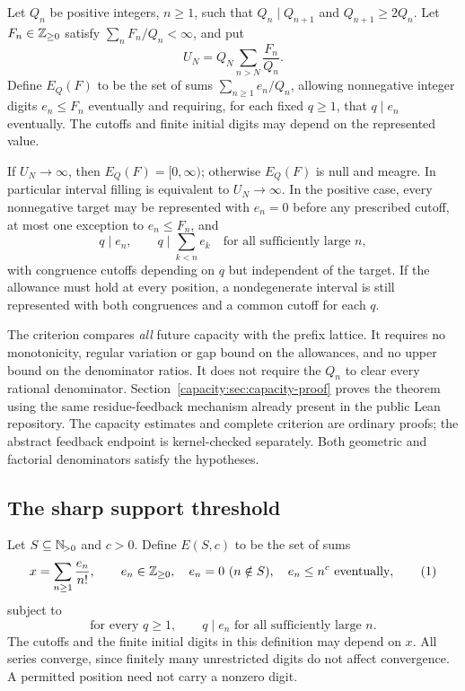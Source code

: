 \documentclass[11pt]{article}
\begin{document}
Let $Q_n$ be positive integers, $n\ge1$, such that $Q_n\mid Q_{n+1}$ and
$Q_{n+1}\ge2Q_n$. Let $F_n\in\mathbb{Z}_{\ge0}$ satisfy
$\sum_nF_n/Q_n<\infty$, and put
\[
 U_N=Q_N\sum_{n>N}\frac{F_n}{Q_n}.
 \tag{C}\label{capacity:eq:capacity}
\]
Define $E_Q(F)$ to be the set of sums $\sum_{n\ge1}e_n/Q_n$, allowing
nonnegative integer digits $e_n\le F_n$ eventually and requiring, for each
fixed $q\ge1$, that $q\mid e_n$ eventually. The cutoffs and finite initial
digits may depend on the represented value.

\begin{theorem}\label{capacity:thm:capacity}
If $U_N\to\infty$, then $E_Q(F)=[0,\infty)$; otherwise $E_Q(F)$ is null
and meagre. In particular interval filling is equivalent to $U_N\to\infty$.
In the positive case, every nonnegative target may be represented with
$e_n=0$ before any prescribed cutoff, at most one exception to $e_n\le F_n$,
and
\[
 q\mid e_n,\qquad q\mid\sum_{k<n}e_k
 \quad\text{for all sufficiently large }n,
\]
with congruence cutoffs depending on $q$ but independent of the target.
If the allowance must hold at every position, a nondegenerate interval is
still represented with both congruences and a common cutoff for each $q$.
\end{theorem}
The criterion compares \emph{all} future capacity with the prefix lattice.
It requires no monotonicity, regular variation or gap bound on the allowances,
and no upper bound on the denominator ratios. It does not require the $Q_n$
to clear every rational denominator. Section~\ref{capacity:sec:capacity-proof} proves
the theorem using the same residue-feedback mechanism already present in
the public Lean repository. The capacity estimates and complete criterion
are ordinary proofs; the abstract feedback endpoint is kernel-checked
separately. Both geometric and factorial denominators satisfy the hypotheses.

\subsection{The sharp support threshold}
Let $S\subseteq\mathbb{N}_{\!>0}$ and $c>0$. Define $E(S,c)$ to be the set of sums
\[
 x=\sum_{n\ge1}\frac{e_n}{n!},\qquad e_n\in\Z_{\ge0},\quad
 e_n=0\ (n\notin S),\quad e_n\le n^c\text{ eventually},
 \tag{1}\label{capacity:eq:class}
\]
subject to
\[
 \text{for every }q\ge1,\qquad q\mid e_n\text{ for all sufficiently large }n.
 \tag{2}\label{capacity:eq:congruence}
\]
The cutoffs and the finite initial digits in this definition may depend on $x$.
All series converge, since finitely many unrestricted digits do not affect
convergence. A permitted position need not carry a nonzero digit.
\end{document}
